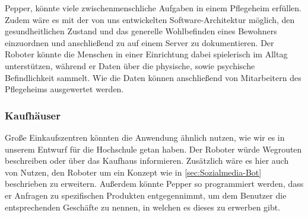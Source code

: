 Pepper, könnte viele zwischenmenschliche Aufgaben in einem Pflegeheim erfüllen. Zudem wäre es mit der von uns entwickelten Software-Architektur möglich, den gesundheitlichen Zustand und das generelle Wohlbefinden eines Bewohners einzuordnen und anschließend zu auf einem Server zu dokumentieren. Der Roboter könnte die Menschen in einer Einrichtung dabei spielerisch im Alltag unterstützen, während er Daten über die physische, sowie psychische Befindlichkeit sammelt. Wie die Daten können anschließend von Mitarbeitern des Pflegeheims ausgewertet werden.

\subsubsection{Kaufhäuser}

Große Einkaufszentren könnten die Anwendung ähnlich nutzen, wie wir es in unserem Entwurf für die Hochschule getan haben. Der Roboter würde Wegrouten beschreiben oder über das Kaufhaus informieren. Zusätzlich wäre es hier auch von Nutzen, den Roboter um ein Konzept wie in \ref{sec:Sozialmedia-Bot} beschrieben zu erweitern. Außerdem könnte Pepper so programmiert werden, dass er Anfragen zu spezifischen Produkten entgegennimmt, um dem Benutzer die entsprechenden Geschäfte zu nennen, in welchen es dieses zu erwerben gibt.
